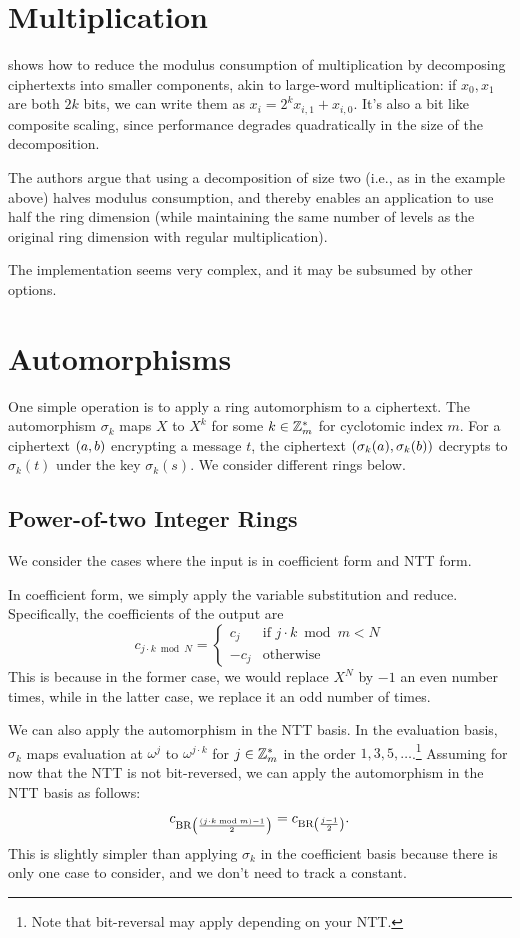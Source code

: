 \documentclass[../fheimpl.tex]{subfiles}
\begin{document}
\section{Multiplication}
    \cite{cryptoeprint:2023/1788} shows how to reduce the modulus consumption of multiplication by decomposing ciphertexts into smaller components, akin to large-word multiplication: if $x_0,x_1$ are both $2k$ bits, we can write them as $x_i = 2^kx_{i,1} + x_{i,0}$. It's also a bit like composite scaling, since performance degrades quadratically in the size of the decomposition.
    
    The authors argue that using a decomposition of size two (i.e., as in the example above) halves modulus consumption, and thereby enables an application to use half the ring dimension (while maintaining the same number of levels as the original ring dimension with regular multiplication).
    
    The implementation seems very complex, and it may be subsumed by other options.

\section{Automorphisms}
\label{sec:automorphisms}
One simple operation is to apply a ring automorphism to a ciphertext. The automorphism $\sigma_k$ maps $X$ to $X^k$ for some $k\in \Z_m^*$ for cyclotomic index $m$. For a ciphertext $\parens*{a, b}$ encrypting a message $t$, the ciphertext $\parens*{\sigma_k(a), \sigma_k(b)}$ decrypts to $\sigma_k(t)$ under the key $\sigma_k(s)$. We consider different rings below.

\subsection{Power-of-two Integer Rings}
We consider the cases where the input is in coefficient form and NTT form.

In coefficient form, we simply apply the variable substitution and reduce. Specifically, the coefficients of the output are
\[c_{j\cdot k\bmod N} = 
\begin{cases}
	c_j  & \text{if $j\cdot k\bmod m < N$}\\
	-c_j & \text{otherwise}
\end{cases}\] 
This is because in the former case, we would replace $X^N$ by $-1$ an even number times, while in the latter case, we replace it an odd number of times.

We can also apply the automorphism in the NTT basis. In the evaluation basis, $\sigma_k$ maps evaluation at $\omega^j$ to $\omega^{j\cdot k}$ for $j\in\Z_m^*$ in the order $1, 3, 5, \ldots$.\footnote{Note that bit-reversal may apply depending on your NTT.} Assuming for now that the NTT is not bit-reversed, we can apply the automorphism in the NTT basis as follows:
\[c_{\mathrm{BR}\parens*{\frac{(j\cdot k \bmod m) - 1}{2}}} = 
 	c_{\mathrm{BR}\parens*{\frac{j - 1}{2}}}.\]
This is slightly simpler than applying $\sigma_k$ in the coefficient basis because there is only one case to consider, and we don't need to track a constant.
\end{document}
